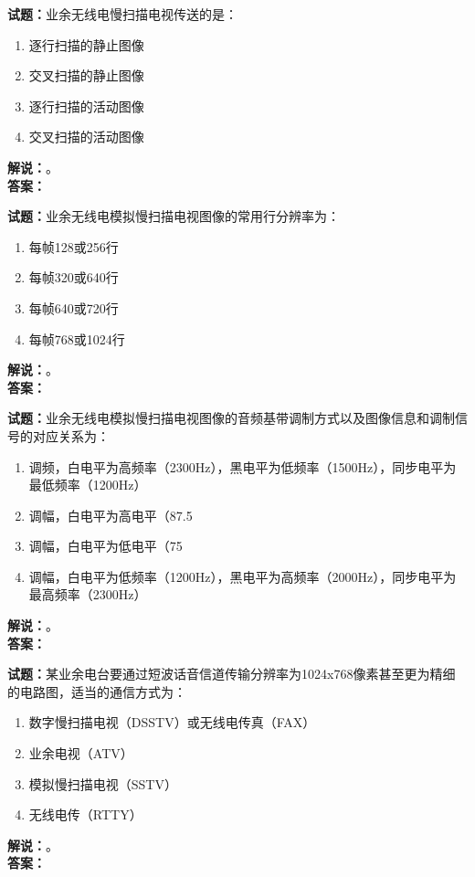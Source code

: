 \documentclass{ctexbook}
\begin{document}
\vspace{\baselineskip}

\noindent\textbf{试题：}业余无线电慢扫描电视传送的是：
\begin{enumerate}[leftmargin=3em]
  \item 逐行扫描的静止图像
  \item 交叉扫描的静止图像
  \item 逐行扫描的活动图像
  \item 交叉扫描的活动图像
\end{enumerate}
\noindent\textbf{解说：}\textbf{}。\\\noindent\textbf{答案：}

\vspace{\baselineskip}

\noindent\textbf{试题：}业余无线电模拟慢扫描电视图像的常用行分辨率为：
\begin{enumerate}[leftmargin=3em]
  \item 每帧128或256行
  \item 每帧320或640行
  \item 每帧640或720行
  \item 每帧768或1024行
\end{enumerate}
\noindent\textbf{解说：}\textbf{}。\\\noindent\textbf{答案：}

\vspace{\baselineskip}

\noindent\textbf{试题：}业余无线电模拟慢扫描电视图像的音频基带调制方式以及图像信息和调制信号的对应关系为：
\begin{enumerate}[leftmargin=3em]
  \item 调频，白电平为高频率（2300Hz），黑电平为低频率（1500Hz），同步电平为最低频率（1200Hz）
  \item 调幅，白电平为高电平（87.5%
  \item 调幅，白电平为低电平（75%
  \item 调幅，白电平为低频率（1200Hz），黑电平为高频率（2000Hz），同步电平为最高频率（2300Hz）
\end{enumerate}
\noindent\textbf{解说：}\textbf{}。\\\noindent\textbf{答案：}

\vspace{\baselineskip}

\noindent\textbf{试题：}某业余电台要通过短波话音信道传输分辨率为1024x768像素甚至更为精细的电路图，适当的通信方式为：
\begin{enumerate}[leftmargin=3em]
  \item 数字慢扫描电视（DSSTV）或无线电传真（FAX）
  \item 业余电视（ATV）
  \item 模拟慢扫描电视（SSTV）
  \item 无线电传（RTTY）
\end{enumerate}
\noindent\textbf{解说：}\textbf{}。\\\noindent\textbf{答案：}
\end{document}
